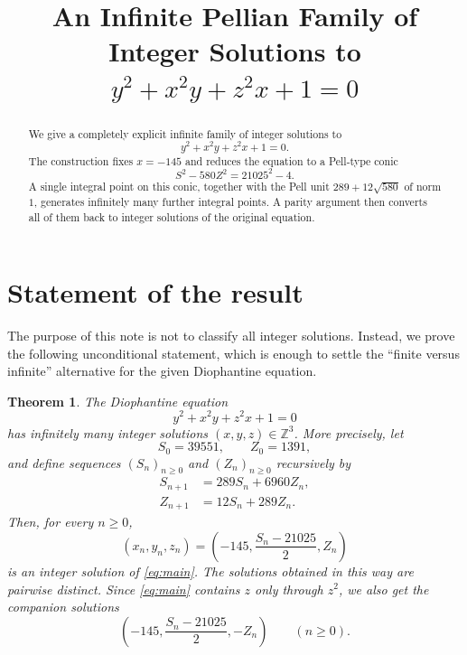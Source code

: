 \documentclass[11pt]{article}
\title{An Infinite Pellian Family of Integer Solutions to\\
\texorpdfstring{$y^2+x^2y+z^2x+1=0$}{y^2+x^2 y+z^2 x+1=0}}
\author{}
\date{}
\numberwithin{equation}{section}
\newtheorem{theorem}{Theorem}[section]
\newcommand{\Z}{\mathbb Z}
\begin{document}
\maketitle

\begin{abstract}
We give a completely explicit infinite family of integer solutions to
\[
        y^2+x^2y+z^2x+1=0.
\]
The construction fixes $x=-145$ and reduces the equation to a Pell-type conic
\[
        S^2-580Z^2=21025^2-4.
\]
A single integral point on this conic, together with the Pell unit
$289+12\sqrt{580}$ of norm $1$, generates infinitely many further integral
points. A parity argument then converts all of them back to integer solutions
of the original equation.
\end{abstract}

\section{Statement of the result}

The purpose of this note is not to classify all integer solutions. Instead, we
prove the following unconditional statement, which is enough to settle the
``finite versus infinite'' alternative for the given Diophantine equation.

\begin{theorem}\label{thm:main}
The Diophantine equation
\begin{equation}\label{eq:main}
        y^2+x^2y+z^2x+1=0
\end{equation}
has infinitely many integer solutions $(x,y,z)\in\Z^3$.
More precisely, let
\begin{equation}\label{eq:initial-SZ}
        S_0=39551,\qquad Z_0=1391,
\end{equation}
and define sequences $(S_n)_{n\geq 0}$ and $(Z_n)_{n\geq 0}$ recursively by
\begin{equation}\label{eq:recurrence}
\begin{aligned}
        S_{n+1}&=289S_n+6960Z_n,\\
        Z_{n+1}&=12S_n+289Z_n.
\end{aligned}
\end{equation}
Then, for every $n\geq 0$,
\begin{equation}\label{eq:family}
        (x_n,y_n,z_n)
        =\left(-145,\frac{S_n-21025}{2},Z_n\right)
\end{equation}
is an integer solution of \eqref{eq:main}. The solutions obtained in this way
are pairwise distinct. Since \eqref{eq:main} contains $z$ only through $z^2$,
we also get the companion solutions
\begin{equation}\label{eq:family-pm}
        \left(-145,\frac{S_n-21025}{2},-Z_n\right)
        \qquad(n\geq 0).
\end{equation}
\end{theorem}
\end{document}
